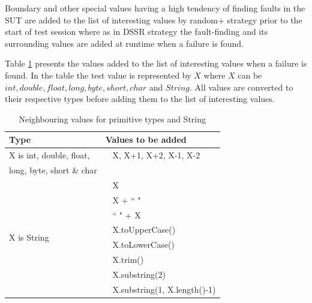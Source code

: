 Boundary and other special values having a high tendency of finding faults in the SUT are added to the list of interesting values by random+ strategy prior to the start of test session where as in DSSR strategy the fault-finding and its surrounding values are added at runtime when a failure is found. 

Table \ref{table:addvalues2} presents the values added to the list of interesting values when a failure is found. In the table the test value is represented by $X$ where $X$ can be $int, double, float, long, byte, short, char$ and $String$. All values are converted to their respective types before adding them to the list of interesting values.

\begin{table}[ht]
\caption{Neighbouring values for primitive types and String} %
\bigskip
\centering %
{\renewcommand{\arraystretch}{1.5} %
\begin{tabular}{| l | l |} %
\hline\hline %
{\textbf {Type}} & {\textbf {Values to be added}}\\ [0.5ex] %
\hline %
\multirow{1}{*}{X is int, double, float, } & ~ X,  X+1, X+2, X-1, X-2 \\ %
\multirow{1}{*}{long, byte, short \& char} &  \\ 

\hline
\multirow{8}{*}{X is String} & ~ X\\ %

& ~ X + ``  "\\ %
& ~ ``  " + X \\ %
& ~ X.toUpperCase() \\
& ~ X.toLowerCase() \\
& ~ X.trim() \\
& ~ X.substring(2) \\
& ~ X.substring(1, X.length()-1) \\[1ex]
\hline
\hline %
\end{tabular}
}
\bigskip
\label{table:addvalues2} %
\end{table}







